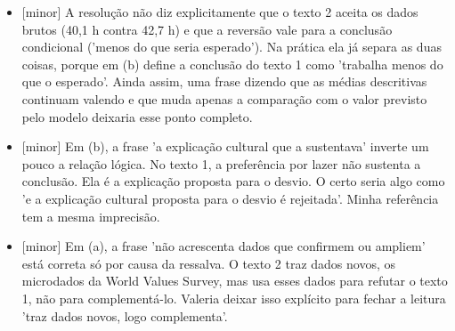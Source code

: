 \documentclass{article}%
\begin{document}
\begin{itemize}%
\item%
{[}minor{]} A resolução não diz explicitamente que o texto 2 aceita os dados brutos (40,1 h contra 42,7 h) e que a reversão vale para a conclusão condicional ('menos do que seria esperado'). Na prática ela já separa as duas coisas, porque em (b) define a conclusão do texto 1 como 'trabalha menos do que o esperado'. Ainda assim, uma frase dizendo que as médias descritivas continuam valendo e que muda apenas a comparação com o valor previsto pelo modelo deixaria esse ponto completo.%
\item%
{[}minor{]} Em (b), a frase 'a explicação cultural que a sustentava' inverte um pouco a relação lógica. No texto 1, a preferência por lazer não sustenta a conclusão. Ela é a explicação proposta para o desvio. O certo seria algo como 'e a explicação cultural proposta para o desvio é rejeitada'. Minha referência tem a mesma imprecisão.%
\item%
{[}minor{]} Em (a), a frase 'não acrescenta dados que confirmem ou ampliem' está correta só por causa da ressalva. O texto 2 traz dados novos, os microdados da World Values Survey, mas usa esses dados para refutar o texto 1, não para complementá{-}lo. Valeria deixar isso explícito para fechar a leitura 'traz dados novos, logo complementa'.%
\end{itemize}%
\end{document}
